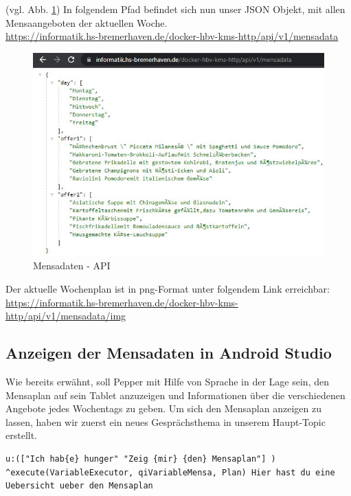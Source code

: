 (vgl. Abb. \ref{fig:mensaapi}) In folgendem Pfad befindet sich nun unser JSON Objekt, mit allen Mensaangeboten der aktuellen Woche.\\
\url{https://informatik.hs-bremerhaven.de/docker-hbv-kms-http/api/v1/mensadata}
\\
\begin{figure}[H]
    \centering
    \includegraphics[width=13cm]{Figures/AppChapter/mensa_5.JPG}
    \caption{Mensadaten - API}
    \label{fig:mensaapi}
    \centering
\end{figure}

Der aktuelle Wochenplan ist in png-Format unter folgendem Link erreichbar:\\
\url{https://informatik.hs-bremerhaven.de/docker-hbv-kms-http/api/v1/mensadata/img}\\


\subsection{Anzeigen der Mensadaten in Android Studio}

Wie bereits erwähnt, soll Pepper mit Hilfe von Sprache in der Lage sein, den Mensaplan auf sein Tablet anzuzeigen und Informationen über die verschiedenen Angebote jedes Wochentags zu geben. Um sich den Mensaplan anzeigen zu lassen, haben wir zuerst ein neues Gesprächsthema in unserem Haupt-Topic erstellt. \\

\begin{lstlisting}
u:(["Ich hab{e} hunger" "Zeig {mir} {den} Mensaplan"] ) 
^execute(VariableExecutor, qiVariableMensa, Plan) Hier hast du eine 
Uebersicht ueber den Mensaplan
\end{lstlisting}

